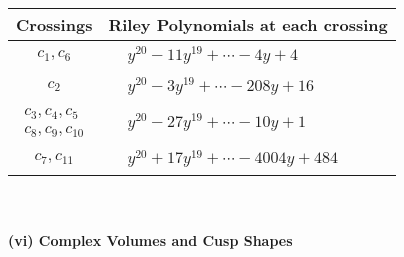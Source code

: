 \documentclass[1p]{elsarticle_modified}
\theoremstyle{definition}
\begin{document}
\begin{tabular}{m{50pt}|m{274pt}}
Crossings & \hspace{64pt}Riley Polynomials at each crossing \\
\hline $$\begin{aligned}c_{1},c_{6}\end{aligned}$$&$\begin{aligned}
&y^{20}-11 y^{19}+\cdots-4 y+4
\end{aligned}$\\
\hline $$\begin{aligned}c_{2}\end{aligned}$$&$\begin{aligned}
&y^{20}-3 y^{19}+\cdots-208 y+16
\end{aligned}$\\
\hline $$\begin{aligned}c_{3},c_{4},c_{5}\\c_{8},c_{9},c_{10}\end{aligned}$$&$\begin{aligned}
&y^{20}-27 y^{19}+\cdots-10 y+1
\end{aligned}$\\
\hline $$\begin{aligned}c_{7},c_{11}\end{aligned}$$&$\begin{aligned}
&y^{20}+17 y^{19}+\cdots-4004 y+484
\end{aligned}$\\
\hline
\end{tabular}\\~\\
\newpage\flushleft \textbf{(vi) Complex Volumes and Cusp Shapes}
\end{document}

